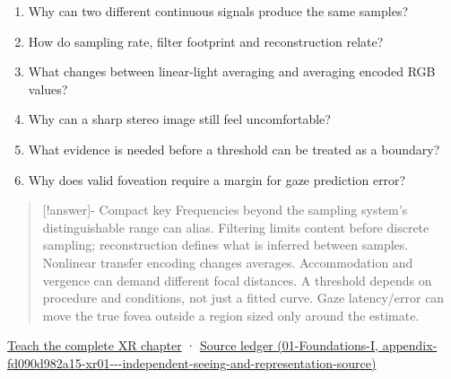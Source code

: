 \begin{enumerate}
\def\labelenumi{\arabic{enumi}.}
\tightlist
\item
  Why can two different continuous signals produce the same samples?
\item
  How do sampling rate, filter footprint and reconstruction relate?
\item
  What changes between linear-light averaging and averaging encoded RGB values?
\item
  Why can a sharp stereo image still feel uncomfortable?
\item
  What evidence is needed before a threshold can be treated as a boundary?
\item
  Why does valid foveation require a margin for gaze prediction error?
\end{enumerate}

\begin{quote}
{[}!answer{]}- Compact key Frequencies beyond the sampling system's distinguishable range can alias. Filtering limits content before discrete sampling; reconstruction defines what is inferred between samples. Nonlinear transfer encoding changes averages. Accommodation and vergence can demand different focal distances. A threshold depends on procedure and conditions, not just a fitted curve. Gaze latency/error can move the true fovea outside a region sized only around the estimate.
\end{quote}

\hyperref[04-visual-computing-ii-ch042-sampling-is-a-question-of-what-remains-distinguishable]{Teach the complete XR chapter} · \href{../01-Foundations-I/main.pdf\#nameddest=appendix-fd090d982a15-xr01---independent-seeing-and-representation-source}{Source ledger (01-Foundations-I, appendix-fd090d982a15-xr01-\/-\/-independent-seeing-and-representation-source)}
